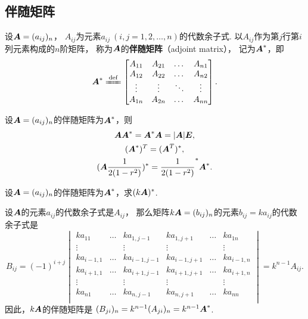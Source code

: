 \subsection{伴随矩阵}
\begin{definition}\label{definition:伴随矩阵.伴随矩阵的定义}
设\(\boldsymbol{A}=(a_{ij})_n\)，
\(A_{ij}\)为元素\(a_{ij}\ (i,j=1,2,\dotsc,n)\)的代数余子式.
以\(A_{ij}\)作为第\(j\)行第\(i\)列元素构成的\(n\)阶矩阵，
称为\(\boldsymbol{A}\)的\textbf{伴随矩阵}（adjoint matrix），
记为\(\boldsymbol{A}^*\)，即\[
	\A^*
	\defeq \begin{bmatrix}
		A_{11} & A_{21} & \dots & A_{n1} \\
		A_{12} & A_{22} & \dots & A_{n2} \\
		\vdots & \vdots & \ddots & \vdots \\
		A_{1n} & A_{2n} & \dots & A_{nn}
	\end{bmatrix}.
\]
\end{definition}

\begin{theorem}
设\(\boldsymbol{A}=(a_{ij})_n\)的伴随矩阵为\(\boldsymbol{A}^*\)，则\begin{gather}
\boldsymbol{A} \boldsymbol{A}^* = \boldsymbol{A}^* \boldsymbol{A} = \abs{\boldsymbol{A}} \boldsymbol{E}, \label{equation:行列式.伴随矩阵.恒等式1} \\
(\boldsymbol{A}^*)^T = (\boldsymbol{A}^T)^*, \label{equation:行列式.伴随矩阵.恒等式2} \\
(\boldsymbol{A}\frac{1}{2(1-r^2)})^* = \frac{1}{2(1-r^2)}^* \boldsymbol{A}^*. \label{equation:行列式.伴随矩阵.恒等式3}
\end{gather}
\end{theorem}

\begin{example}
设\(\boldsymbol{A}=(a_{ij})_n\)的伴随矩阵为\(\boldsymbol{A}^*\)，求\((k\boldsymbol{A})^*\).
\begin{solution}
设\(\boldsymbol{A}\)的元素\(a_{ij}\)的代数余子式是\(A_{ij}\)，%
那么矩阵\(k\boldsymbol{A} = (b_{ij})_n\)的元素\(b_{ij} = k a_{ij}\)的代数余子式是\[
	B_{ij}
	= (-1)^{i+j} \begin{vmatrix}
		k a_{11} & \dots & k a_{1,j-1} & k a_{1,j+1} & \dots & k a_{1n} \\
		\vdots & & \vdots & \vdots & & \vdots \\
		k a_{i-1,1} & \dots & k a_{i-1,j-1} & k a_{i-1,j+1} & \dots & k a_{i-1,n} \\
		k a_{i+1,1} & \dots & k a_{i+1,j-1} & k a_{i+1,j+1} & \dots & k a_{i+1,n} \\
		\vdots & & \vdots & \vdots & & \vdots \\
		k a_{n1} & \dots & k a_{n,j-1} & k a_{n,j+1} & \dots & k a_{nn} \\
	\end{vmatrix}
	= k^{n-1} A_{ij}.
\]
因此，\(k\boldsymbol{A}\)的伴随矩阵是
\((B_{ji})_n = k^{n-1} (A_{ji})_n
= k^{n-1} \boldsymbol{A}^*\).
\end{solution}
\end{example}


